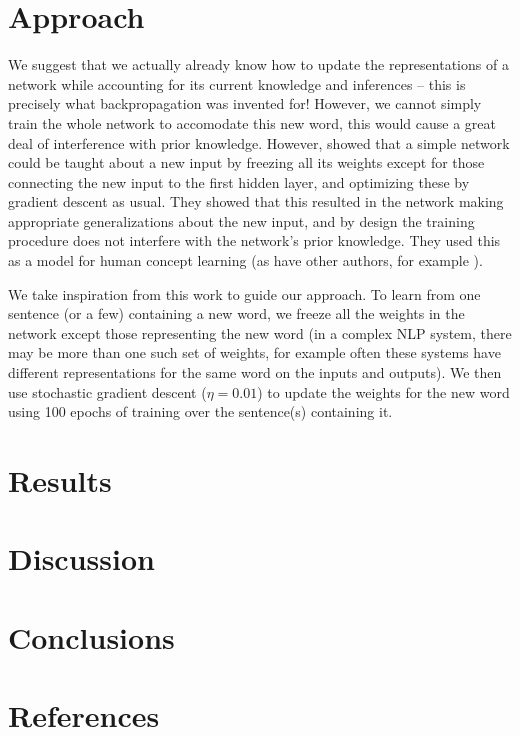 \documentclass{article}
\begin{document}
\section{Approach}
We suggest that we actually already know how to update the representations of a network while accounting for its current knowledge and inferences -- this is precisely what backpropagation was invented for! However, we cannot simply train the whole network to accomodate this new word, this would cause a great deal of interference with prior knowledge. However, \citet{Rumelhart1993} showed that a simple network could be taught about a new input by freezing all its weights except for those connecting the new input to the first hidden layer, and optimizing these by gradient descent as usual. They showed that this resulted in the network making appropriate generalizations about the new input, and by design the training procedure does not interfere with the network's prior knowledge. They used this as a model for human concept learning (as have other authors, for example \citet{Rogers2004}). \par
We take inspiration from this work to guide our approach. To learn from one sentence (or a few) containing a new word, we freeze all the weights in the network except those representing the new word (in a complex NLP system, there may be more than one such set of weights, for example often these systems have different representations for the same word on the inputs and outputs). We then use stochastic gradient descent (\(\eta = 0.01\)) to update the weights for the new word using 100 epochs of training over the sentence(s) containing it. \par

\section{Results}

\section{Discussion}

\section{Conclusions}

\section*{References}


\end{document}
